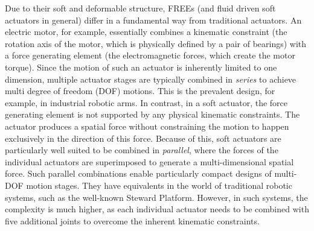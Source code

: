 Due to their soft and deformable structure, FREEs (and fluid driven soft actuators in general) differ in a fundamental way from traditional actuators.
An electric motor, for example, essentially combines a kinematic constraint (the rotation axis of the motor, which is physically defined by a pair of bearings) with a force generating element (the electromagnetic forces, which create the motor torque).
Since the motion of such an actuator is inherently limited to one dimension, multiple actuator stages are typically combined in \emph{series} to achieve multi degree of freedom (DOF) motions. 
This is the prevalent design, for example, in industrial robotic arms.
In contrast, in a soft actuator, the force generating element is not supported by any physical kinematic constraints.
The actuator produces a spatial force without constraining the motion to happen exclusively in the direction of this force.
Because of this, soft actuators are particularly well suited to be combined in \emph{parallel}, where the forces of the individual actuators are superimposed to generate a multi-dimensional spatial force.
Such parallel combinations enable particularly compact designs of multi-DOF motion stages.
They have equivalents in the world of traditional robotic systems, such as the well-known Steward Platform.
However, in such systems, the complexity is much higher, as each individual actuator needs to be combined with five additional joints to overcome the inherent kinematic constraints.




